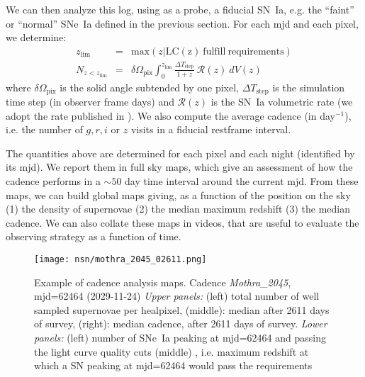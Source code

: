 We can then analyze this log, using as a probe, a fiducial SN~Ia,
e.g. the ``faint'' or ``normal'' SNe~Ia defined in the previous
section. For each mjd and each pixel, we determine:
\begin{eqnarray}
  z_{\mathrm{lim}} & = & \mathrm{max}\left(z | \mathrm{LC(z)\ fulfill\ requirements}\right) \\
  N_{z<z_{\mathrm{lim}}} &= & \delta\Omega_{\mathrm{pix}} \int_0^{z_\mathrm{lim}} \frac{\Delta T_{\mathrm{step}}}{1+z}\ {\mathcal{R}}(z)\ dV(z)
\end{eqnarray}
where $\delta\Omega_{\mathrm{pix}}$ is the solid angle subtended by
one pixel, $\Delta T_{\mathrm{step}}$ is the simulation time step (in
observer frame days) and $\mathcal{R}(z)$ is the SN~Ia volumetric rate
(we adopt the rate published in \cite{perrett}).  We also
compute the average cadence (in day$^{-1}$), i.e. the number of $g, r,
i$ or $z$ visits in a fiducial restframe interval.

The quantities above are determined for each pixel and each night
(identified by its mjd).  We report them in full sky maps, which give
an assessment of how the cadence performs in a $\sim 50$ day time
interval around the current mjd. From these maps, we can build global
maps giving, as a function of the position on the sky (1) the density
of supernovae (2) the median maximum redshift (3) the median cadence.
We can also collate these maps in videos, that are useful to evaluate
the observing strategy as a function of time.

\begin{sidewaysfigure}
    \begin{center}
      \texttt{[image: nsn/mothra\_2045\_02611.png]}
      \caption{Example of cadence analysis maps.  Cadence {\em
          Mothra\_2045}, mjd=62464 (2029-11-24) {\em Upper panels:}
        (left) total number of well sampled supernovae per healpixel,
        (middle): median \zmed after 2611 days of survey, (right):
        median cadence, after 2611 days of survey. {\em Lower panels:}
        (left) number of SNe~Ia peaking at mjd=62464 and passing the
        light curve quality cuts (middle) \zmed, i.e.  maximum
        redshift at which a SN peaking at mjd=62464 would pass the
        requirements}
    \end{center}
\end{sidewaysfigure}


